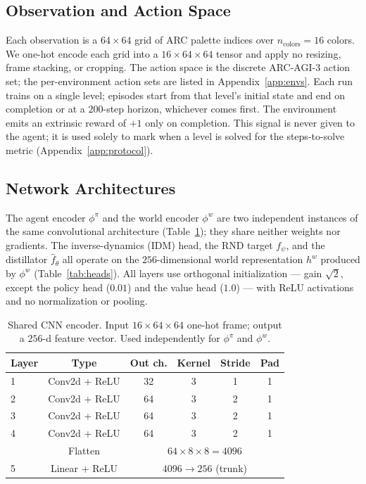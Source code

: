 \documentclass{article}
\begin{document}
\subsection{Observation and Action Space}
\label{app:obs}
Each observation is a $64\times64$ grid of ARC palette indices over
$n_{\text{colors}}=16$ colors. We one-hot encode each grid into a
$16\times64\times64$ tensor and apply no resizing, frame stacking, or cropping.
The action space is the discrete ARC-AGI-3 action set; the per-environment
action sets are listed in Appendix~\ref{app:envs}. Each run trains on a single level; episodes start from that
level's initial state and end on completion or at a $200$-step horizon,
whichever comes first. The environment emits an extrinsic reward of $+1$ only on
completion. This signal is never given to the agent; it is used solely to mark
when a level is solved for the steps-to-solve metric (Appendix~\ref{app:protocol}).

\subsection{Network Architectures}
\label{app:arch}
The agent encoder $\phi^\pi$ and the world encoder $\phi^w$ are two independent
instances of the same convolutional architecture (Table~\ref{tab:cnn}); they
share neither weights nor gradients. The inverse-dynamics (IDM) head, the RND
target $f_\psi$, and the distillator $\hat{f}_\theta$ all operate on the
$256$-dimensional world representation $h^w$ produced by $\phi^w$
(Table~\ref{tab:heads}). All layers use orthogonal initialization --- gain
$\sqrt{2}$, except the policy head ($0.01$) and the value head ($1.0$) --- with
ReLU activations and no normalization or pooling.

\begin{table}[h]
\centering
\caption{Shared CNN encoder. Input $16\times64\times64$ one-hot frame; output a
$256$-d feature vector. Used independently for $\phi^\pi$ and $\phi^w$.}
\label{tab:cnn}
\begin{tabular}{lccccc}
\toprule
Layer & Type & Out ch. & Kernel & Stride & Pad \\
\midrule
1 & Conv2d + ReLU & 32 & 3 & 1 & 1 \\
2 & Conv2d + ReLU & 64 & 3 & 2 & 1 \\
3 & Conv2d + ReLU & 64 & 3 & 2 & 1 \\
4 & Conv2d + ReLU & 64 & 3 & 2 & 1 \\
  & Flatten       & \multicolumn{4}{c}{$64\times8\times8 = 4096$} \\
5 & Linear + ReLU & \multicolumn{4}{c}{$4096 \to 256$ (trunk)} \\
\bottomrule
\end{tabular}
\end{table}
\end{document}
